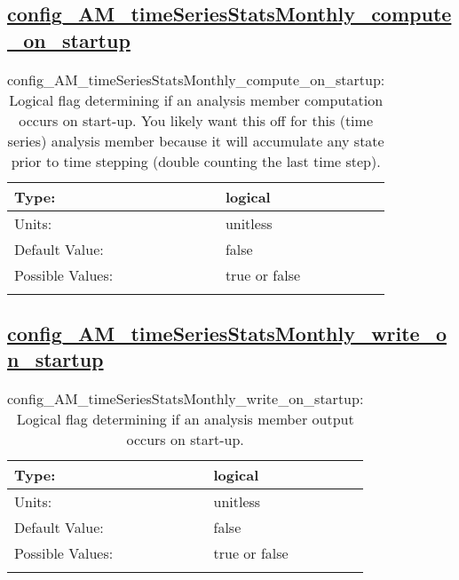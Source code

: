 \subsection[config\_AM\_timeSeriesStatsMonthly\_compute\_on\_startup]{\hyperref[sec:nm_tab_AM_timeSeriesStatsMonthly]{config\_AM\_timeSeriesStatsMonthly\_compute\_on\_startup}}
\label{subsec:nm_sec_config_AM_timeSeriesStatsMonthly_compute_on_startup}
\begin{center}
\begin{longtable}{| p{2.0in} || p{4.0in} |}
    \hline
    Type: & logical \\
    \hline
    Units: & \si{unitless} \\
    \hline
    Default Value: & false \\
    \hline
    Possible Values: & true or false \\
    \hline
    \caption{config\_AM\_timeSeriesStatsMonthly\_compute\_on\_startup: Logical flag determining if an analysis member computation occurs on start-up. You likely want this off for this (time series) analysis member because it will accumulate any state prior to time stepping (double counting the last time step).}
\end{longtable}
\end{center}
\subsection[config\_AM\_timeSeriesStatsMonthly\_write\_on\_startup]{\hyperref[sec:nm_tab_AM_timeSeriesStatsMonthly]{config\_AM\_timeSeriesStatsMonthly\_write\_on\_startup}}
\label{subsec:nm_sec_config_AM_timeSeriesStatsMonthly_write_on_startup}
\begin{center}
\begin{longtable}{| p{2.0in} || p{4.0in} |}
    \hline
    Type: & logical \\
    \hline
    Units: & \si{unitless} \\
    \hline
    Default Value: & false \\
    \hline
    Possible Values: & true or false \\
    \hline
    \caption{config\_AM\_timeSeriesStatsMonthly\_write\_on\_startup: Logical flag determining if an analysis member output occurs on start-up.}
\end{longtable}
\end{center}

